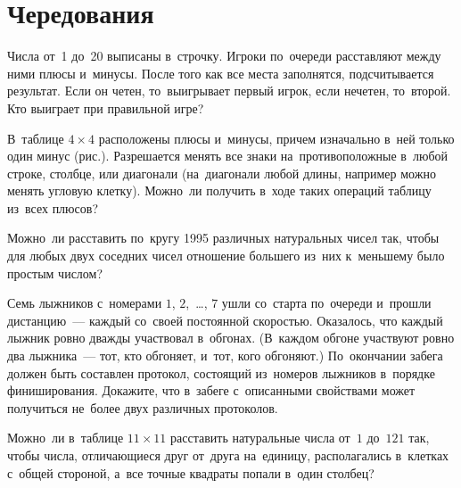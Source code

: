 
\section*{Чередования}


\begin{problems}

\item
Числа от~1 до~20 выписаны в~строчку.
Игроки по~очереди расставляют между ними плюсы и~минусы.
После того как все места заполнятся, подсчитывается результат.
Если он четен, то~выигрывает первый игрок, если нечетен, то~второй.
Кто выиграет при правильной игре?

\item
\begin{minipage}[t][][t]{0.78\linewidth}
В~таблице $4 \times 4$ расположены плюсы и~минусы, причем изначально в~ней
только один минус (рис.).
Разрешается менять все знаки на~противоположные в~любой строке, столбце, или
диагонали (на~диагонали любой длины, например можно менять угловую клетку).
Можно~ли получить в~ходе таких операций таблицу из~всех плюсов?
\end{minipage}%
\hfill
\begin{minipage}[t][][b]{0.20\linewidth}
    \vspace{-1ex}
\end{minipage}

\item
Можно~ли расставить по~кругу 1995 различных натуральных чисел так, чтобы для
любых двух соседних чисел отношение большего из~них к~меньшему было простым
числом?

\item
Семь лыжников с~номерами $1$, $2$,~\ldots, $7$ ушли со~старта по~очереди
и~прошли дистанцию~--- каждый со~своей постоянной скоростью.
Оказалось, что каждый лыжник ровно дважды участвовал в~обгонах.
(В~каждом обгоне участвуют ровно два лыжника~--- тот, кто обгоняет, и~тот, кого
обгоняют.)
По~окончании забега должен быть составлен протокол, состоящий из~номеров
лыжников в~порядке финиширования.
Докажите, что в~забеге с~описанными свойствами может получиться не~более двух
различных протоколов.

\item
Можно~ли в~таблице $11 \times 11$ расставить натуральные числа от~$1$ до~$121$
так, чтобы числа, отличающиеся друг от~друга на~единицу, располагались
в~клетках с~общей стороной, а~все точные квадраты попали в~один столбец?


\end{problems}
